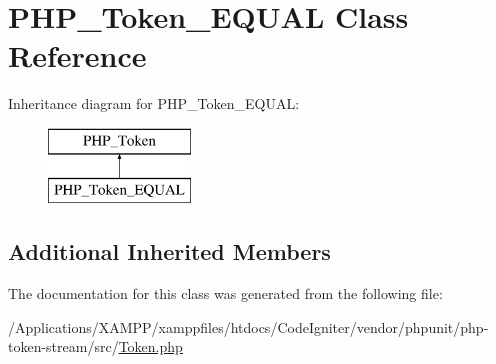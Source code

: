 \hypertarget{class_p_h_p___token___e_q_u_a_l}{}\section{P\+H\+P\+\_\+\+Token\+\_\+\+E\+Q\+U\+AL Class Reference}
\label{class_p_h_p___token___e_q_u_a_l}
Inheritance diagram for P\+H\+P\+\_\+\+Token\+\_\+\+E\+Q\+U\+AL\+:\begin{figure}[H]
\begin{center}
\leavevmode
\includegraphics[height=2.000000cm]{class_p_h_p___token___e_q_u_a_l}
\end{center}
\end{figure}
\subsection*{Additional Inherited Members}


The documentation for this class was generated from the following file\+:\begin{DoxyCompactItemize}
\item 
/\+Applications/\+X\+A\+M\+P\+P/xamppfiles/htdocs/\+Code\+Igniter/vendor/phpunit/php-\/token-\/stream/src/\mbox{\hyperlink{_token_8php}{Token.\+php}}\end{DoxyCompactItemize}
